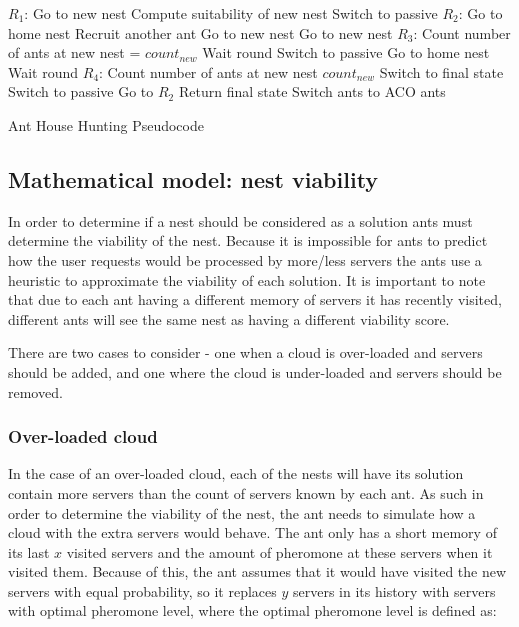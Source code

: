 \documentclass[conference]{IEEEtran}
\begin{document}
\begin{algorithm}
\begin{algorithmic}
	\State $R_{1}$: Go to new nest
	\State Compute suitability of new nest
		Switch to passive
	\EndIf
	\State $R_{2}$: Go to home nest
		\State Recruit another ant
		\State Go to new nest
		\State Go to new nest
	\EndIf
	\State $R_{3}$: Count number of ants at new nest = $count_{new}$
		\State Wait round
		\State Switch to passive
		\State Go to home nest
		\State Wait round
	\EndIf
	\State $R_{4}$: Count number of ants at new nest $count_{new}$
		\State Switch to final state
		\State Switch to passive
		\State Go to $R_{2}$
	\EndIf
	\State Return final state
	\State Switch ants to ACO ants
\end{algorithmic}
\caption{Ant House Hunting Pseudocode}\label{ant:pseudocodeHouseHunting}
\end{algorithm}

\subsection{Mathematical model: nest viability}

In order to determine if a nest should be considered as a solution ants must determine the viability of the nest. Because it is impossible for ants to predict how the user requests would be processed by more/less servers the ants use a heuristic to approximate the viability of each solution. It is important to note that due to each ant having a different memory of servers it has recently visited, different ants will see the same nest as having a different viability score.

There are two cases to consider - one when a cloud is over-loaded and servers should be added, and one where the cloud is under-loaded and servers should be removed.

\subsubsection{Over-loaded cloud}

In the case of an over-loaded cloud, each of the nests will have its solution contain more servers than the count of servers known by each ant. As such in order to determine the viability of the nest, the ant needs to simulate how a cloud with the extra servers would behave. The ant only has a short memory of its last $x$ visited servers and the amount of pheromone at these servers when it visited them. Because of this, the ant assumes that it would have visited the new servers with equal probability, so it replaces $y$ servers in its history with servers with optimal pheromone level, where the optimal pheromone level is defined as:
\end{document}
